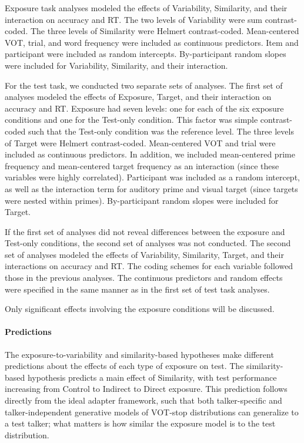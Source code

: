 \documentclass[
  12pt,
  twoside]{article}
\begin{document}
Exposure task analyses modeled the effects of Variability, Similarity, and their interaction on accuracy and RT.
The two levels of Variability were sum contrast-coded.
The three levels of Similarity were Helmert contrast-coded.
Mean-centered VOT, trial, and word frequency were included as continuous predictors.
Item and participant were included as random intercepts.
By-participant random slopes were included for Variability, Similarity, and their interaction.

For the test task, we conducted two separate sets of analyses.
The first set of analyses modeled the effects of Exposure, Target, and their interaction on accuracy and RT.
Exposure had seven levels: one for each of the six exposure conditions and one for the Test-only condition.
This factor was simple contrast-coded such that the Test-only condition was the reference level.
The three levels of Target were Helmert contrast-coded.
Mean-centered VOT and trial were included as continuous predictors.
In addition, we included mean-centered prime frequency and mean-centered target frequency as an interaction (since these variables were highly correlated).
Participant was included as a random intercept, as well as the interaction term for auditory prime and visual target (since targets were nested within primes).
By-participant random slopes were included for Target.

If the first set of analyses did not reveal differences between the exposure and Test-only conditions, the second set of analyses was not conducted.
The second set of analyses modeled the effects of Variability, Similarity, Target, and their interactions on accuracy and RT.
The coding schemes for each variable followed those in the previous analyses.
The continuous predictors and random effects were specified in the same manner as in the first set of test task analyses.

Only significant effects involving the exposure conditions will be discussed.

\hypertarget{predictions}{%
\paragraph{Predictions}\label{predictions}}

The exposure-to-variability and similarity-based hypotheses make different predictions about the effects of each type of exposure on test.
The similarity-based hypothesis predicts a main effect of Similarity, with test performance increasing from Control to Indirect to Direct exposure.
This prediction follows directly from the ideal adapter framework, such that both talker-specific and talker-independent generative models of VOT-stop distributions can generalize to a test talker; what matters is how similar the exposure model is to the test distribution.
\end{document}
